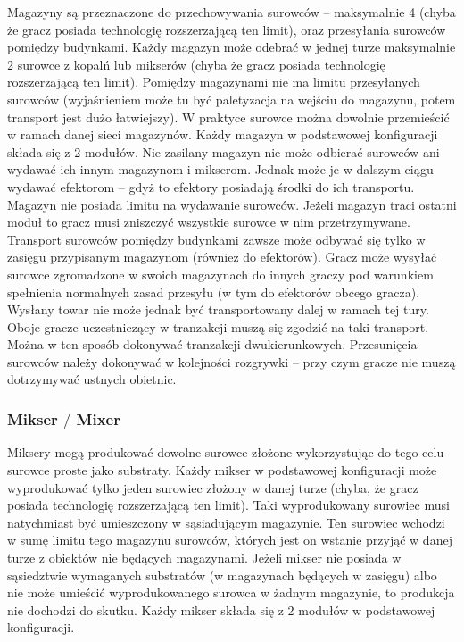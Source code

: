 \documentclass[11pt,a4paper]{article}
\begin{document}
Magazyny są przeznaczone do przechowywania surowców -- maksymalnie 4 (chyba że gracz posiada technologię rozszerzającą ten limit), oraz przesyłania surowców pomiędzy budynkami. Każdy magazyn może odebrać w jednej turze maksymalnie 2 surowce z kopalń lub mikserów (chyba że gracz posiada technologię rozszerzającą ten limit). Pomiędzy magazynami nie ma limitu przesyłanych surowców (wyjaśnieniem może tu być paletyzacja na wejściu do magazynu, potem transport jest dużo łatwiejszy). W praktyce surowce można dowolnie przemieścić w ramach danej sieci magazynów. Każdy magazyn w podstawowej konfiguracji składa się z 2 modułów. Nie zasilany magazyn nie może odbierać surowców ani wydawać ich innym magazynom i mikserom. Jednak może je w dalszym ciągu wydawać efektorom -- gdyż to efektory posiadają środki do ich transportu. Magazyn nie posiada limitu na wydawanie surowców. Jeżeli magazyn traci ostatni moduł to gracz musi zniszczyć wszystkie surowce w nim przetrzymywane. Transport surowców pomiędzy budynkami zawsze może odbywać się tylko w zasięgu przypisanym magazynom (również do efektorów). Gracz może wysyłać surowce zgromadzone w swoich magazynach do innych graczy pod warunkiem spełnienia normalnych zasad przesyłu (w tym do efektorów obcego gracza). Wysłany towar nie może jednak być transportowany dalej w ramach tej tury. Oboje gracze uczestniczący w tranzakcji muszą się zgodzić na taki transport. Można w ten sposób dokonywać tranzakcji dwukierunkowych. Przesunięcia surowców należy dokonywać w kolejności rozgrywki -- przy czym gracze nie muszą dotrzymywać ustnych obietnic.

\subsubsection{Mikser $/$ Mixer}

Miksery mogą produkować dowolne surowce złożone wykorzystując do tego celu surowce proste jako substraty. Każdy mikser w podstawowej konfiguracji może wyprodukować tylko jeden surowiec złożony w danej turze (chyba, że gracz posiada technologię rozszerzającą ten limit). Taki wyprodukowany surowiec musi natychmiast być umieszczony w sąsiadującym magazynie. Ten surowiec wchodzi w sumę limitu tego magazynu surowców, których jest on wstanie przyjąć w danej turze z obiektów nie będących magazynami. Jeżeli mikser nie posiada w sąsiedztwie wymaganych substratów (w magazynach będących w zasięgu) albo nie może umieścić wyprodukowanego surowca w żadnym magazynie, to produkcja nie dochodzi do skutku. Każdy mikser składa się z 2 modułów w podstawowej konfiguracji.
\end{document}
